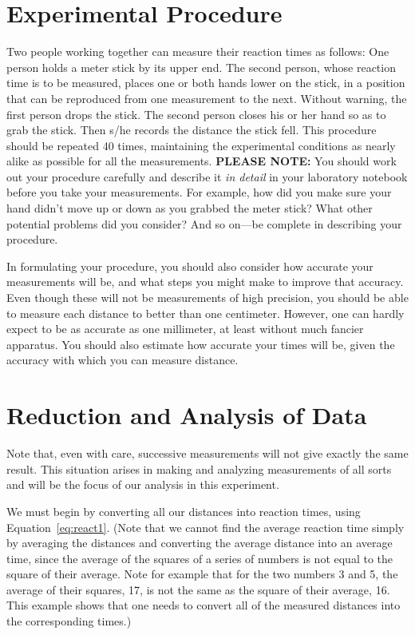 \section*{Experimental Procedure}
     Two people working together can measure their reaction times
as follows:  One person holds a meter stick by its upper end.
The second person, whose reaction time is to be measured, places
one or both hands lower on the stick, in a position that can be
reproduced from one measurement to the next.  Without warning,
the first person drops the stick.  The second person closes his
or her hand so as to grab the stick.  Then s/he records the
distance the stick fell. This procedure should be repeated 40
times, maintaining the experimental conditions as nearly alike as
possible for all the measurements.  {\bf PLEASE NOTE:}  You should work
out your procedure carefully and describe it {\em in detail} in your
laboratory notebook before you take your measurements.  For
example, how did you make sure your hand didn't move up or down
as you grabbed the meter stick?  What other potential problems
did you consider?   And so on---be complete in describing your procedure.

     In formulating your procedure, you should also consider how
accurate your measurements will be, and what steps you might make
to improve that accuracy.  Even though these will not be
measurements of high precision, you should be able to measure
each distance to better than one centimeter.  However, one can
hardly expect to be as accurate as
one millimeter, at least without much fancier apparatus.
You should also estimate how accurate your times
will be, given the accuracy with which you can measure distance.

\section*{Reduction and Analysis of Data}
     Note that, even with care, successive measurements will not
give exactly the same result. This situation arises in making and
analyzing measurements of all sorts and will be the focus of our
analysis in this experiment.

     We must begin by converting all our distances into reaction
times, using Equation~\ref{eq:react1}.  (Note that we cannot find the average
reaction time simply by averaging the distances and converting
the average distance into an average time, since the average of
the squares of a series of numbers is not equal to the square of their
average.  Note for example that for the two numbers 3 and 5, the
average of their squares, 17, is not the same as the square of
their average, 16.  This example shows that one needs to convert
all of the measured distances into the corresponding times.)

